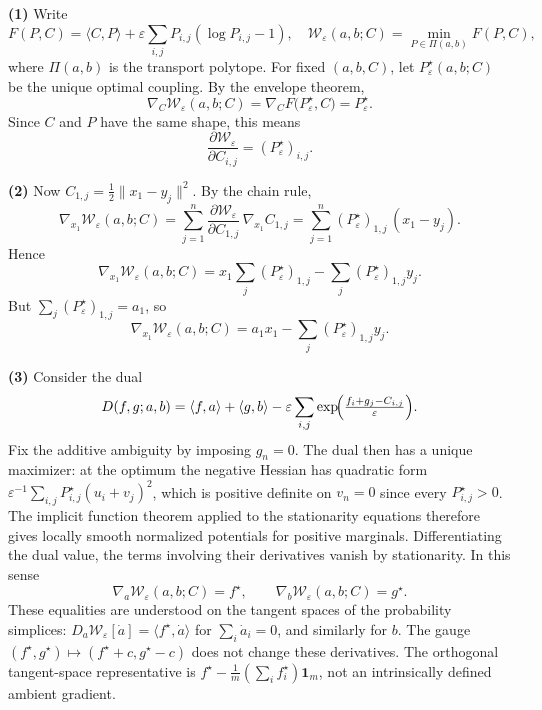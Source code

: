 \documentclass[11pt,a4paper]{article}
\theoremstyle{exostyle}
\newcommand{\W}{\mathcal{W}}
\begin{document}
\begin{solution}
\textbf{(1)} Write
\[
F(P,C) = \langle C,P\rangle + \varepsilon \sum_{i,j} P_{i,j}(\log P_{i,j} - 1),
\quad
\W_\varepsilon(a,b;C) = \min_{P\in\Pi(a,b)} F(P,C),
\]
where $\Pi(a,b)$ is the transport polytope. For fixed $(a,b,C)$, let $P_\varepsilon^\star(a,b;C)$ be the unique optimal coupling. By the envelope theorem,
\[
\nabla_C \W_\varepsilon(a,b;C) = \nabla_C F\bigl(P_\varepsilon^\star,C\bigr)
= P_\varepsilon^\star.
\]
Since $C$ and $P$ have the same shape, this means
\[
\frac{\partial \W_\varepsilon}{\partial C_{i,j}} = (P_\varepsilon^\star)_{i,j}.
\]

\medskip
\textbf{(2)} Now $C_{1,j} = \tfrac12 \|x_1 - y_j\|^2$. By the chain rule,
\[
\nabla_{x_1} \W_\varepsilon(a,b;C)
= \sum_{j=1}^n \frac{\partial \W_\varepsilon}{\partial C_{1,j}} \,\nabla_{x_1} C_{1,j}
= \sum_{j=1}^n (P_\varepsilon^\star)_{1,j} \,(x_1 - y_j).
\]
Hence
\[
\nabla_{x_1} \W_\varepsilon(a,b;C)
= x_1 \sum_{j} (P_\varepsilon^\star)_{1,j} - \sum_j (P_\varepsilon^\star)_{1,j} y_j.
\]
But $\sum_j (P_\varepsilon^\star)_{1,j} = a_1$, so
\[
\nabla_{x_1} \W_\varepsilon(a,b;C)
= a_1 x_1 - \sum_{j} (P_\varepsilon^\star)_{1,j} y_j.
\]

\medskip
\textbf{(3)} Consider the dual
\[
D(f,g;a,b) = \langle f,a\rangle + \langle g,b\rangle
- \varepsilon \sum_{i,j} \exp\!\Bigl(\tfrac{f_i + g_j - C_{i,j}}{\varepsilon}\Bigr).
\]
Fix the additive ambiguity by imposing $g_n=0$. The dual then has a
unique maximizer: at the optimum the negative Hessian has quadratic
form $\varepsilon^{-1}\sum_{i,j}P^\star_{i,j}(u_i+v_j)^2$, which is
positive definite on $v_n=0$ since every $P^\star_{i,j}>0$. The
implicit function theorem applied to the stationarity equations
therefore gives locally smooth normalized potentials for positive
marginals. Differentiating the dual value, the terms involving their
derivatives vanish by stationarity. In this sense
\[
\nabla_a \W_\varepsilon(a,b;C) = f^\star,
\qquad
\nabla_b \W_\varepsilon(a,b;C) = g^\star.
\]
These equalities are understood on the tangent spaces of the probability simplices: $D_a\W_\varepsilon[\dot a]=\langle f^\star,\dot a\rangle$ for $\sum_i\dot a_i=0$, and similarly for $b$. The gauge $(f^\star,g^\star)\mapsto(f^\star+c,g^\star-c)$ does not change these derivatives. The orthogonal tangent-space representative is $f^\star-\frac1m(\sum_i f_i^\star)\mathbf1_m$, not an intrinsically defined ambient gradient.
\end{solution}
\end{document}
